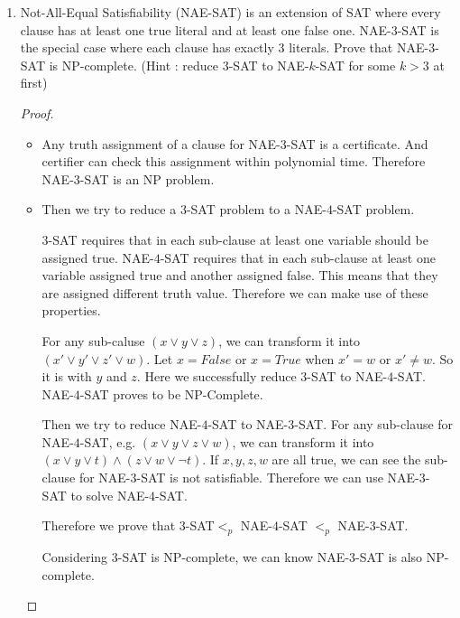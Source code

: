 \documentclass[12pt,a4paper]{article}
\theoremstyle{definition}
\begin{document}
\begin{enumerate}
	\item Not-All-Equal Satisfiability (NAE-SAT) is an extension of SAT where every clause has at least one true literal and at least one false one. NAE-$3$-SAT is the special case where each clause has exactly $3$ literals. Prove that NAE-$3$-SAT is NP-complete. (Hint : reduce $3$-SAT to NAE-$k$-SAT for some $k > 3$ at first)
    \begin{proof}
    \ \\
        \begin{itemize}
            \item 
                Any truth assignment of a clause for NAE-$3$-SAT is a certificate. And certifier can check this assignment within polynomial time. Therefore NAE-$3$-SAT is an NP problem.
            \item 
                Then we try to reduce a $3$-SAT problem to a NAE-$4$-SAT problem.
                
                $3$-SAT requires that in each sub-clause at least one variable should be assigned true. NAE-$4$-SAT requires that in each sub-clause at least one variable assigned true and another assigned false. This means that they are assigned different truth value. Therefore we can make use of these properties.
                
                For any sub-caluse $(x\vee y\vee z)$, we can transform it into $(x' \vee y' \vee z' \vee w)$. Let $x=False$ or $x=True$ when $x'=w$ or $x'\neq w$. So it is with $y$ and $z$. Here we successfully reduce $3$-SAT to NAE-$4$-SAT. NAE-$4$-SAT proves to be NP-Complete.
                
                Then we try to reduce NAE-$4$-SAT to NAE-$3$-SAT. For any sub-clause for NAE-$4$-SAT, e.g. $(x \vee y \vee z \vee w)$, we can transform it into $(x \vee y \vee t)\wedge(z \vee w \vee \lnot t)$. If $x,y,z,w$ are all true, we can see the sub-clause for NAE-$3$-SAT is not satisfiable. Therefore we can use NAE-$3$-SAT to solve NAE-$4$-SAT. 
                
                Therefore we prove that $3$-SAT$<_p$ NAE-$4$-SAT $<_p$ NAE-$3$-SAT.
                
                Considering $3$-SAT is NP-complete, we can know NAE-$3$-SAT is also NP-complete.
                
        \end{itemize}
    \end{proof}


\end{enumerate}
\end{document}
